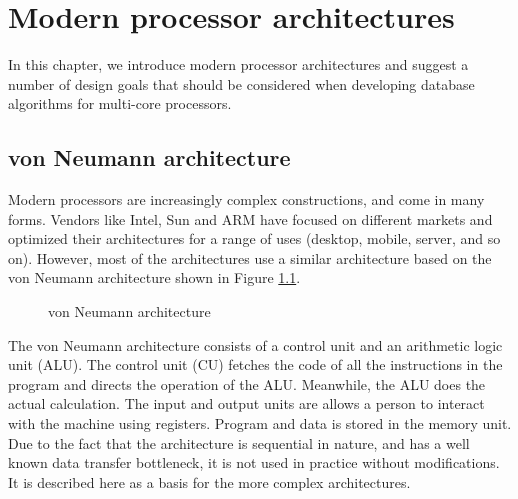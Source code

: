 \documentclass[12pt,a4paper,twoside]{report}
\begin{document}
\chapter{Modern processor architectures}

{ %
	
	In this chapter, we introduce modern processor architectures and
	suggest a number of design goals that should be considered when
	developing database algorithms for multi-core processors.

	\section{von Neumann architecture}

	Modern processors are increasingly complex constructions, and come
	in many forms. Vendors like Intel, Sun and ARM have focused on
	different markets and optimized their architectures for a range of
	uses (desktop, mobile, server, and so on). However, most of the
	architectures use a similar architecture based on the von Neumann
	architecture \cite{von1993first} shown in Figure \ref{fig:neumann}.

	\begin{figure}[H]
		\centering
		\caption{von Neumann architecture}
		\label{fig:neumann}
	\end{figure}

	The von Neumann architecture consists of a control unit and an
	arithmetic logic unit (ALU). The control unit (CU) fetches the
	code of all the instructions in the program and directs the
	operation of the ALU. Meanwhile, the ALU does the actual
	calculation. The input and output units are allows a person to
	interact with the machine using registers. Program and data is
	stored in the memory unit.  Due to the fact that the architecture
	is sequential in nature, and has a well known data transfer
	bottleneck, it is not used in practice without modifications. It
	is described here as a basis for the more complex architectures.

}
\end{document}
